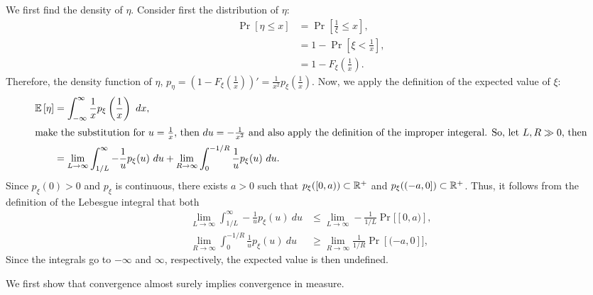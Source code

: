 \begin{problem}{6}
\end{problem}
\begin{solution}
    We first find the density of $\eta$. Consider first the distribution of $\eta$:
    \begin{align*}
        \Pr[\eta \leq x] &= \Pr\left[\frac{1}{\xi} \leq x\right], \\
        &= 1 - \Pr\left[\xi < \frac{1}{x}\right], \\
        &= 1 - F_\xi\left(\frac{1}{x}\right).
    \end{align*}
    Therefore, the density function of $\eta$, $p_\eta = \left(1-F_\xi\left(\frac{1}{x}\right)\right)' = \frac{1}{x^2}p_\xi\left(\frac{1}{x}\right)$. Now, we apply the definition of the expected value of $\xi$:
    \begin{align*}
        \mathbb{E}\left[\eta\right] &= \int_{-\infty}^\infty \frac{1}{x}p_\xi\left(\frac{1}{x}\right)~dx, \\
        \intertext{make the substitution for $u = \frac{1}{x}$, then $du=-\frac{1}{x^2}$ and also apply the definition of the improper integeral. So, let $L,R \gg 0$, then}
        &= \lim_{L\to\infty} \int_{1/L}^\infty -\frac{1}{u}p_\xi(u)~du + \lim_{R\to\infty}\int_0^{-1/R} \frac{1}{u}p_\xi(u)~du. 
    \end{align*}
    Since $p_\xi(0) > 0$ and $p_\xi$ is continuous, there exists $a > 0$ such that $p_\xi([0,a)) \subset \mathbb{R}^+$ and $p_\xi((-a,0]) \subset \mathbb{R}^+$. Thus, it follows from the definition of the Lebesgue integral that both 
    \begin{align*}
        \lim_{L\to\infty} \int_{1/L}^\infty -\frac{1}{u}p_\xi(u)~du &\leq \lim_{L\to\infty} -\frac{1}{1/L} \Pr[[0,a)], \\
        \lim_{R \to\infty} \int_0^{-1/R} \frac{1}{u} p_\xi(u)~du &\geq \lim_{R\to\infty} \frac{1}{1/R} \Pr[(-a,0]],  
    \end{align*}
    Since the integrals go to $-\infty$ and $\infty$, respectively, the expected value is then undefined. 
\end{solution}

\begin{problem}{7}
\end{problem}
\begin{solution}
    
\end{solution}

\begin{problem}{8}
\end{problem}
\begin{solution}
    We first show that convergence almost surely implies convergence in measure. 
\end{solution}

